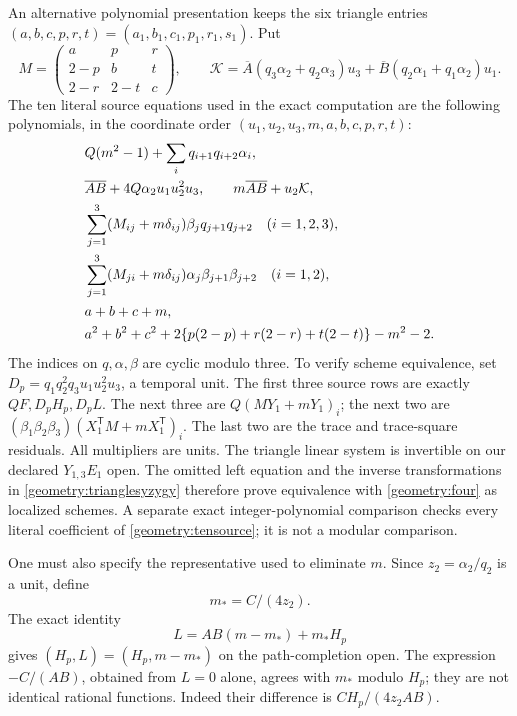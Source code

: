 \documentclass[11pt,a4paper]{article}
\theoremstyle{remark}\newtheorem{remark}[theorem]{Remark}
\newcommand{\Ab}{\overline A}\newcommand{\Bb}{\overline B}
\begin{document}
An alternative polynomial presentation keeps the six triangle entries
\((a,b,c,p,r,t)=(a_1,b_1,c_1,p_1,r_1,s_1)\). Put
\[
 M=\begin{pmatrix}a&p&r\\2-p&b&t\\2-r&2-t&c\end{pmatrix},\qquad
 \mathcal K=\Ab(q_3\alpha_2+q_2\alpha_3)u_3
             +\Bb(q_2\alpha_1+q_1\alpha_2)u_1.
\]
The ten literal source equations used in the exact computation are the
following polynomials, in the coordinate order
\((u_1,u_2,u_3,m,a,b,c,p,r,t)\):
\begin{align}
 &Q(m^2-1)+\sum_iq_{i+1}q_{i+2}\alpha_i,\notag\\
 &\Ab\Bb+4Q\alpha_2u_1u_2^2u_3,\qquad
 m\Ab\Bb+u_2\mathcal K,\notag\\
 &\sum_{j=1}^3(M_{ij}+m\delta_{ij})\beta_jq_{j+1}q_{j+2}
                    \quad(i=1,2,3),\notag\\
 &\sum_{j=1}^3(M_{ji}+m\delta_{ij})\alpha_j\beta_{j+1}\beta_{j+2}
                    \quad(i=1,2),\notag\\
 &a+b+c+m,\notag\\
 &a^2+b^2+c^2+2\{p(2-p)+r(2-r)+t(2-t)\}-m^2-2.
 \label{geometry:tensource}
\end{align}
The indices on \(q,\alpha,\beta\) are cyclic modulo three. To verify
scheme equivalence, set
\(D_p=q_1q_2^2q_3u_1u_2^2u_3\), a temporal unit.
The first three source rows are exactly \(QF,D_pH_p,D_pL\).
The next three are \(Q(MY_1+mY_1)_i\); the next two are
\((\beta_1\beta_2\beta_3)(X_1^{\mathsf T}M+mX_1^{\mathsf T})_i\).
The last two are the trace and trace-square residuals. All multipliers
are units. The triangle linear system is invertible on our declared
\(Y_{1,3}E_1\) open. The omitted left equation and the inverse
transformations in \eqref{geometry:trianglesyzygy} therefore prove
equivalence with \eqref{geometry:four} as localized schemes. A separate
exact integer-polynomial comparison checks every literal coefficient of
\eqref{geometry:tensource}; it is not a modular comparison.

One must also specify the representative used to eliminate \(m\). Since
\(z_2=\alpha_2/q_2\) is a unit, define
\[
 m_* = C/(4z_2).
\]
The exact identity
\begin{equation}\label{geometry:melimination}
 L=AB(m-m_*)+m_*H_p
\end{equation}
gives \((H_p,L)=(H_p,m-m_*)\) on the path-completion open.
The expression \(-C/(AB)\), obtained from \(L=0\) alone, agrees with
\(m_*\) modulo \(H_p\); they are not identical rational functions.
Indeed their difference is \(CH_p/(4z_2AB)\).
\end{document}
